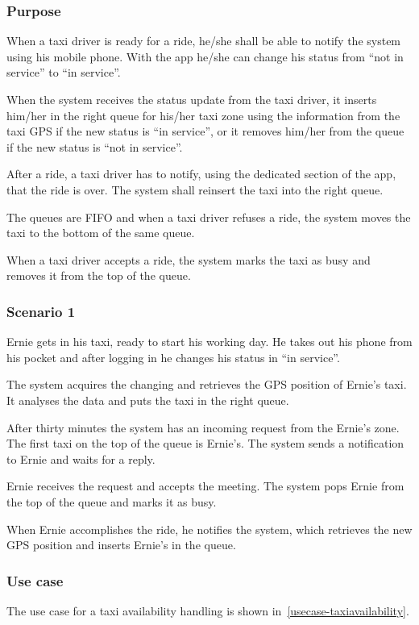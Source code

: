 \label{taxi-availability}
\subsubsection{Purpose}

When a taxi driver is ready for a ride, he/she shall be able to notify the system using his mobile phone. With the app he/she can change his status from ``not in service'' to ``in service''.

When the system receives the status update from the taxi driver, it inserts him/her in the right queue for his/her taxi zone using the information from the taxi GPS if the new status is ``in service'', or it removes him/her from the queue if the new status is ``not in service''.

After a ride, a taxi driver has to notify, using the dedicated section of the app, that the ride is over. The system shall reinsert the taxi into the right queue.

The queues are FIFO and when a taxi driver refuses a ride, the system moves the taxi to the bottom of the same queue.

When a taxi driver accepts a ride, the system marks the taxi as busy and removes it from the top of the queue.

\subsubsection{Scenario 1}
Ernie gets in his taxi, ready to start his working day. He takes out his phone from his pocket and after logging in he changes his status in ``in service''.

The system acquires the changing and retrieves the GPS position of Ernie's taxi. It analyses the data and puts the taxi in the right queue.

After thirty minutes the system has an incoming request from the Ernie's zone. The first taxi on the top of the queue is Ernie's. The system sends a notification to Ernie and waits for a reply.

Ernie receives the request and accepts the meeting. The system pops Ernie from the top of the queue and marks it as busy.

When Ernie accomplishes the ride, he notifies the system, which retrieves the new GPS position and inserts Ernie's in the queue.

\subsubsection{Use case}
The use case for a taxi availability handling is shown in~\autoref{usecase-taxiavailability}.

